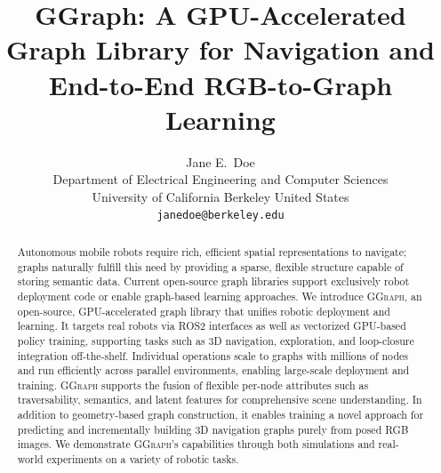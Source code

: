 \documentclass{article}
\title{GGraph: A GPU-Accelerated Graph Library for Navigation and End-to-End RGB-to-Graph Learning}
\author{
  Jane E.~Doe\\
  Department of Electrical Engineering and Computer Sciences\\
  University of California Berkeley 
  United States\\
  \texttt{janedoe@berkeley.edu} \\
}
\newcommand{\sysname}{\textcolor{ggcolor}{\textsc{GGraph}}\xspace}
\begin{document}
\maketitle


\begin{abstract} Autonomous mobile robots require rich, efficient spatial representations to navigate; graphs naturally fulfill this need by providing a sparse, flexible structure capable of storing semantic data. Current open-source graph libraries support exclusively robot deployment code or enable graph-based learning approaches. 
We introduce \sysname, an open-source, GPU-accelerated graph library that unifies robotic deployment and learning. It targets real robots via ROS2 interfaces as well as vectorized GPU-based policy training, supporting tasks such as 3D navigation, exploration, and loop-closure integration off-the-shelf.
Individual operations scale to graphs with millions of nodes and run efficiently across parallel environments, enabling large-scale deployment and training. \sysname supports the fusion of flexible per-node attributes such as traversability, semantics, and latent features for comprehensive scene understanding. In addition to geometry-based graph construction, it enables training a novel approach for predicting and incrementally building 3D navigation graphs purely from posed RGB images. We demonstrate \sysname's capabilities through both simulations and real-world experiments on a variety of robotic tasks.
\end{abstract}

\end{document}
